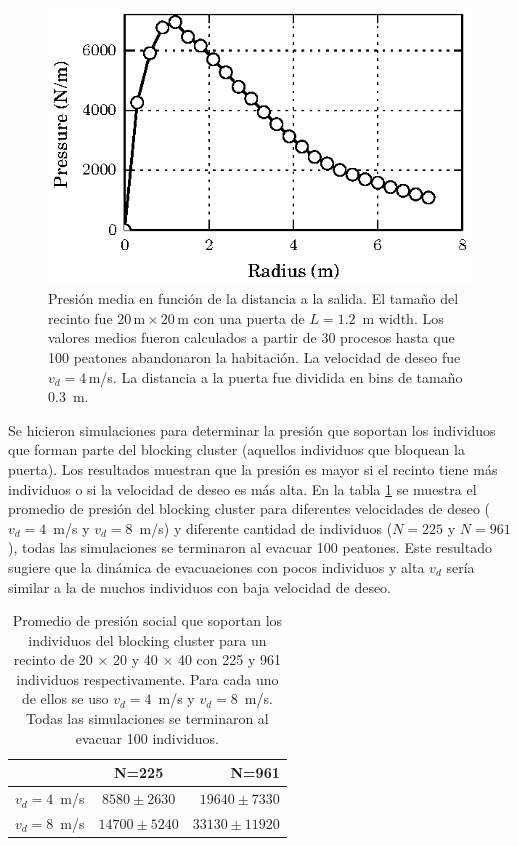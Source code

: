 \begin{figure}[H]
    \centering
    \includegraphics[scale=1.6]{figuras/p_dist.eps}
    \caption[width=5cm]{Presión media en función de la distancia a la salida. El tamaño del recinto fue $20\,\mathrm{m}\times20\,\mathrm{m}$  con una puerta de $L=1.2$~m width. Los valores medios fueron calculados a partir de 30 procesos hasta que 100 peatones abandonaron la habitación. La velocidad de deseo fue $v_d=4\,$m/s. La distancia a la puerta fue dividida en bins de tamaño $0.3$~m.}
    \label{p_dist}
\end{figure}

Se hicieron simulaciones para determinar la presión que soportan los individuos que forman parte del blocking cluster (aquellos individuos que bloquean la puerta). Los resultados muestran que la presión es mayor si el recinto tiene más individuos o si la velocidad de deseo es más alta. En la tabla \ref{tabla_p}  se muestra el promedio de presión del blocking cluster para diferentes velocidades de deseo ($v_d=4$~m/s y $v_d=8$~m/s) y diferente cantidad de individuos ($N=225$ y $N=961$), todas las simulaciones se terminaron al evacuar 100 peatones. Este resultado sugiere que la dinámica de evacuaciones con pocos individuos y alta $v_d$ sería similar a la de muchos individuos con baja velocidad de deseo.

\begin{table}[H]
\begin{center}
   \begin{tabular}{| l | c | r | }
     \hline
      & N=225 & N=961 \\ \hline
     $v_d = 4$~m/s & $8580 \pm 2630$   & $19640 \pm 7330$ \\ \hline
     $v_d = 8$~m/s & $14700 \pm 5240$  & $33130 \pm 11920$  \\
     \hline
   \end{tabular}
 \end{center}
   \caption[width=5cm]{Promedio de presión social que soportan los individuos del blocking cluster para un recinto de 20 $\times$ 20 y 40 $\times$ 40 con 225 y 961 individuos respectivamente. Para cada uno de ellos se uso $v_d=4$~m/s y $v_d=8$~m/s. Todas las simulaciones se terminaron al evacuar 100 individuos.}
   \label{tabla_p}
   \end{table}   
   
